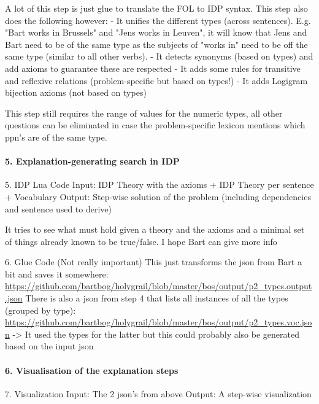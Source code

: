 {A lot of this step is just glue to translate the FOL to IDP syntax. This step also does the following however:
- It unifies the different types (across sentences). E.g. "Bart works in Brussels" and "Jens works in Leuven", it will know that Jens and Bart need to be of the same type as the subjects of "works in" need to be off the same type (similar to all other verbs). 
- It detects synonyms (based on types) and add axioms to guarantee these are respected
- It adds some rules for transitive and reflexive relations (problem-specific but based on types!)
- It adds Logigram bijection axioms (not based on types)

This step still requires the range of values for the numeric types, all other questions can be eliminated in case the problem-specific lexicon mentions which ppn's are of the same type.


\paragraph{5. Explanation-generating search in IDP}



5. IDP Lua Code
Input: IDP Theory with the axioms + IDP Theory per sentence + Vocabulary
Output: Step-wise solution of the problem (including dependencies and sentence used to derive)

It tries to see what must hold given a theory and the axioms and a minimal set of things already known to be true/false. I hope Bart can give more info

6. Glue Code
(Not really important)
This just transforms the json from Bart a bit and saves it somewhere: \url{https://github.com/bartbog/holygrail/blob/master/bos/output/p2_types.output.json}
There is also a json from step 4 that lists all instances of all the types (grouped by type): \url{https://github.com/bartbog/holygrail/blob/master/bos/output/p2_types.voc.json}
-> It used the types for the latter but this could probably also be generated based on the input json

\paragraph{6. Visualisation of the explanation steps}


7. Visualization
Input: The 2 json's from above
Output: A step-wise visualization
}
